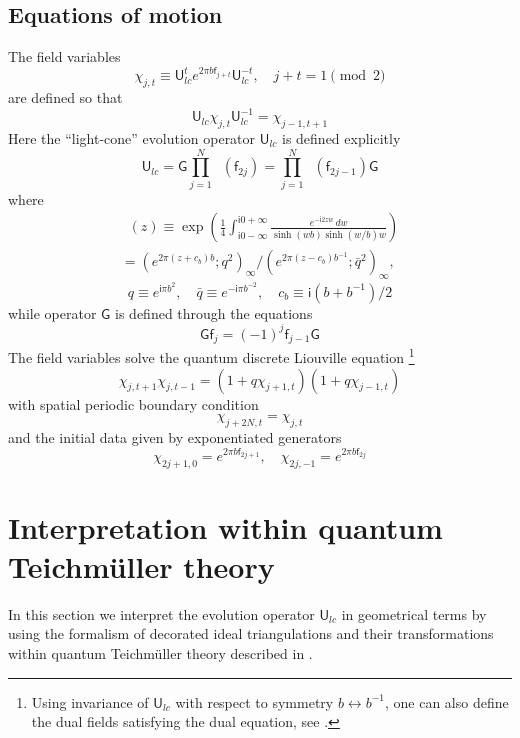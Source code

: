 \documentclass[a4paper,draft]{amsart}
\theoremstyle{definition}
\theoremstyle{remark}
\newcommand{\cla}{c_b}
\newcommand{\GEN}{\mathsf f}
\newcommand{\IMUN}{\mathsf i}
\newcommand{\la}{b}
\newcommand{\LC}{\mathsf U_{lc}}
\newcommand{\QDILOG}{\mathop{\varphi_b}}
\newcommand{\SHFL}{\mathsf G}
\begin{document}
\subsection{Equations of motion}
The field variables 
\[
\chi_{j,t}\equiv \LC^t e^{2\pi\la\GEN_{j+t}}\LC^{-t},\quad j+t=1\pmod2
\]
are defined so that
\[
\LC\chi_{j,t}\LC^{-1}=\chi_{j-1,t+1}
\]
Here
the ``light-cone'' evolution operator $\LC$ is defined explicitly
\begin{equation}
\label{eq:lc}
\LC=\SHFL\prod_{j=1}^N\QDILOG(\GEN_{2j})
=\prod_{j=1}^N\QDILOG(\GEN_{2j-1})\SHFL 
\end{equation}
where
\begin{multline*}
\QDILOG(z)\equiv\exp\left(\frac{1}{4}
\int_{\IMUN 0-\infty}^{\IMUN 0+\infty}
\frac{e^{-\IMUN 2 zw}\, dw}{\sinh(w\la)
\sinh(w/\la) w}\right)\\
=
(e^{2\pi (z+\cla)\la};q^2)_\infty/
(e^{2\pi (z-\cla)\la^{-1}};\bar q^2)_\infty,
\end{multline*}
\[
q\equiv e^{\IMUN\pi\la^2},\quad
\bar q\equiv e^{-\IMUN\pi\la^{-2}},\quad \cla\equiv\IMUN(\la+\la^{-1})/2
\]
while operator $\SHFL$ is defined through the equations
\begin{equation}\label{eq:shfl}
\SHFL\GEN_j=(-1)^{j}\GEN_{j-1}\SHFL
\end{equation}
The field variables solve the 
quantum discrete Liouville equation
\footnote{Using invariance of $\LC$ with respect to 
symmetry $\la\leftrightarrow\la^{-1}$, 
one can also define the dual fields satisfying the dual equation, see 
\cite{fkv}.}
\[
\chi_{j,t+1}\chi_{j,t-1}
   =(1+q\chi_{j+1,t})(1+q\chi_{j-1,t})
\]
with spatial periodic boundary condition
\[
\chi_{j+2N,t}=\chi_{j,t}
\]
and the initial data given by exponentiated generators
\[
\chi_{2j+1,0}=e^{2\pi\la\GEN_{2j+1}},\quad 
\chi_{2j,-1}=e^{2\pi\la\GEN_{2j}}
\]

\section{Interpretation within quantum Teichm\"uller theory}
\label{sec:qdl-qtt}
In this section we interpret the evolution operator $\LC$ in geometrical 
terms by
using the formalism of
decorated ideal triangulations and 
their transformations within quantum 
Teichm\"uller theory
described in \cite{kash3}.
\end{document}

